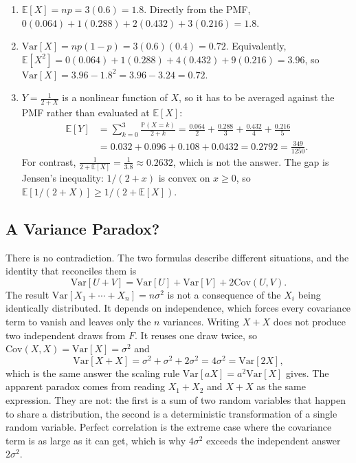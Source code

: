 \documentclass[11pt]{article}
\begin{document}
\begin{enumerate}
  \item $\mathbb{E}[X] = np = 3(0.6) = \mathbf{1.8}$. Directly from the PMF,
        $0(0.064) + 1(0.288) + 2(0.432) + 3(0.216) = 1.8$.

  \item $\mathrm{Var}[X] = np(1-p) = 3(0.6)(0.4) = \mathbf{0.72}$. Equivalently,
        $\mathbb{E}[X^2] = 0(0.064) + 1(0.288) + 4(0.432) + 9(0.216) = 3.96$, so
        $\mathrm{Var}[X] = 3.96 - 1.8^2 = 3.96 - 3.24 = 0.72$.

  \item $Y = \frac{1}{2+X}$ is a nonlinear function of $X$, so it has to be averaged against the PMF
        rather than evaluated at $\mathbb{E}[X]$:
        \begin{align*}
          \mathbb{E}[Y] &= \sum_{k=0}^{3} \frac{\mathbb{P}(X=k)}{2+k}
          = \frac{0.064}{2} + \frac{0.288}{3} + \frac{0.432}{4} + \frac{0.216}{5}\\
          &= 0.032 + 0.096 + 0.108 + 0.0432 = \mathbf{0.2792} = \frac{349}{1250}.
        \end{align*}
        For contrast, $\frac{1}{2 + \mathbb{E}[X]} = \frac{1}{3.8} \approx 0.2632$, which is not the
        answer. The gap is Jensen's inequality: $1/(2+x)$ is convex on $x \ge 0$, so
        $\mathbb{E}[1/(2+X)] \ge 1/(2+\mathbb{E}[X])$.
\end{enumerate}

\subsection{A Variance Paradox?}

There is no contradiction. The two formulas describe different situations, and the identity that
reconciles them is
\[
  \mathrm{Var}[U + V] = \mathrm{Var}[U] + \mathrm{Var}[V] + 2\mathrm{Cov}(U,V).
\]
The result $\mathrm{Var}[X_1 + \cdots + X_n] = n\sigma^2$ is not a consequence of the $X_i$ being
identically distributed. It depends on independence, which forces every covariance term to vanish and
leaves only the $n$ variances. Writing $X + X$ does not produce two independent draws from $F$. It reuses
one draw twice, so $\mathrm{Cov}(X, X) = \mathrm{Var}[X] = \sigma^2$ and
\[
  \mathrm{Var}[X + X] = \sigma^2 + \sigma^2 + 2\sigma^2 = 4\sigma^2 = \mathrm{Var}[2X],
\]
which is the same answer the scaling rule $\mathrm{Var}[aX] = a^2\mathrm{Var}[X]$ gives. The apparent
paradox comes from reading $X_1 + X_2$ and $X + X$ as the same expression. They are not: the first is a
sum of two random variables that happen to share a distribution, the second is a deterministic
transformation of a single random variable. Perfect correlation is the extreme case where the covariance
term is as large as it can get, which is why $4\sigma^2$ exceeds the independent answer $2\sigma^2$.
\end{document}

